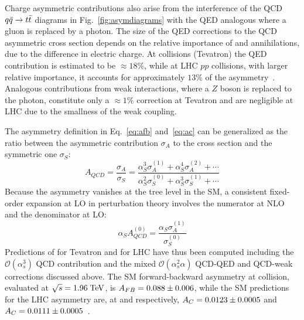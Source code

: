 Charge asymmetric contributions also arise from the interference of
the QCD $\mbox{$q\bar{q}$}{}\to{}\mbox{$t\bar{t}$}{}$ diagrams in
Fig.~\ref{fig:asymdiagrams} with the QED analogous where a gluon is
replaced by a photon. The size of the QED corrections to the QCD
asymmetric cross section depends on the relative importance of \uubar{}
and \ddbar{} annihilations, due to the difference in electric charge.
At \ppbar{} collisions (Tevatron) the QED contribution is estimated to
be $\approx{}18\%$, while at LHC $pp$ collisions, with larger relative
\ddbar{} importance, it accounts for approximately $13\%$ of the
asymmetry~\cite{Kuhn:2011ri}.
Analogous contributions from weak interactions, where a $Z$ boson is
replaced to the photon, constitute only a $\approx{}1\%$ correction at
Tevatron and are negligible at LHC due to the smallness of the
weak coupling.

The asymmetry definition in Eq.~\ref{eq:afb} and~\ref{eq:ac} can be
generalized as the ratio between the asymmetric contribution
$\sigma_A$ to the cross section and the symmetric one $\sigma_S$:
\begin{equation}
  A_{QCD} = \frac{\sigma_A}{\sigma_S} = 
  \frac{\alpha_S^3\sigma_A^{(1)}+\alpha_S^4\sigma_A^{(2)}+\cdots{}}
  {\alpha_S^2\sigma_S^{(0)}+\alpha_S^3\sigma_S^{(1)}+\cdots{}}
\end{equation}
Because the asymmetry vanishes at the tree level in the SM, a
consistent fixed-order expansion at LO in perturbation theory involves the
numerator at NLO and the denominator at LO:
\begin{equation}
  \alpha_SA_{QCD}^{(0)}=\frac{\alpha_S\sigma_A^{(1)}}{\sigma_S^{(0)}}
\end{equation}
Predictions of \afb{} for Tevatron and \ac{} for LHC have thus been
computed including the $\mathcal{O}(\alpha_s^3)$
QCD contribution and the mixed $\mathcal{O}(\alpha_s^2\alpha)$ QCD-QED
and QCD-weak corrections discussed above. The SM forward-backward
asymmetry at \ppbar{} collision, evaluated at $\sqrt{s}=1.96\; \mathrm{TeV}{}$,
is $\mbox{$A_{FB}$}{} = 0.088\pm{}0.006$, while the SM predictions for the LHC
asymmetry are, at \seventev{} and \eighttev{} respectively,
$\mbox{$A_C$}{}=0.0123\pm{}0.0005$ and
$\mbox{$A_C$}{}=0.0111\pm0.0005$~\cite{Bernreuther:2012sx}.
 
